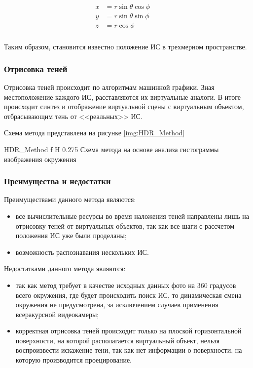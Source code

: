 \begin{equation}
	\begin{aligned}
		\begin{split}
			x &= r \sin\theta \cos\phi &&\\
			y &= r \sin\theta \sin\phi &&\\
			z &= r \cos\phi &&\\
		\end{split}
	\end{aligned}
\end{equation}

Таким образом, становится известно положение ИС в трехмерном пространстве.

\subsubsection*{Отрисовка теней}

Отрисовка теней происходит по алгоритмам машинной графики. Зная местоположение каждого ИС, расставляются их виртуальные аналоги. В итоге происходит синтез и отображение виртуальной сцены с виртуальным объектом, отбрасывающим тень от <<реальных>> ИС.

Схема метода представлена на рисунке \ref{img:HDR_Method}

	{HDR_Method}
	{f}
	{H}
	{0.275\textwidth}
	{Схема метода на основе анализа гистограммы изображения окружения}

\subsubsection*{Преимущества и недостатки}

Преимуществами данного метода являются: 
\begin{itemize}
	\item все вычислительные ресурсы во время наложения теней направлены лишь на отрисовку теней от виртуальных объектов, так как все шаги с рассчетом положения ИС уже были проделаны;
	\item возможность распознавания нескольких ИС.
\end{itemize}

Недостатками данного метода являются:
\begin{itemize}
	\item так как метод требует в качестве исходных данных фото на 360 градусов всего окружения, где будет происходить поиск ИС, то динамическая смена окружения не предусмотрена, за исключением случаев применения всеракурсной видеокамеры;
	\item корректная отрисовка теней происходит только на плоской горизонтальной поверхности, на которой располагается виртуальный объект, нельзя воспроизвести искажение тени, так как нет информации о поверхности, на которую производится проецирование.
\end{itemize}

